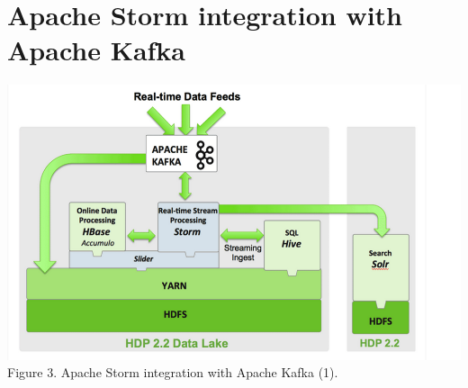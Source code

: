 \documentclass{hcmutarticle}
\begin{document}
\section{Apache Storm integration with Apache Kafka}

\begin{center}
\includegraphics[scale=0.6]{image/storm-kafka-1.png}\\[0.5cm]
Figure 3. Apache Storm integration with Apache Kafka (1).
\end{center}
\end{document}
